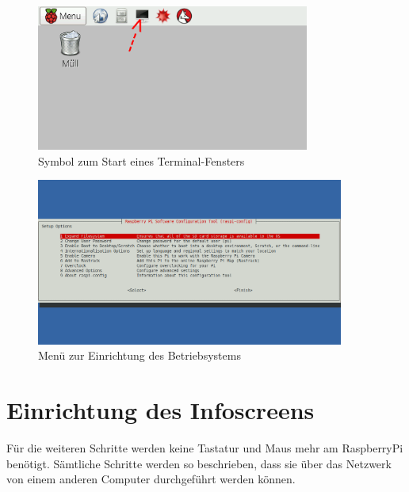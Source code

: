 \begin{figure}[h!]
	\centering
		\includegraphics[width=0.8\textwidth]{./fotos/terminal.png}
	\caption{Symbol zum Start eines Terminal-Fensters}
	\label{fig:rpiterminal}
\end{figure}

\begin{figure}[h!]
	\centering
		\includegraphics[width=0.9\textwidth]{./fotos/menu1.png}
	\caption{Menü zur Einrichtung des Betriebsystems}
	\label{fig:menu}
\end{figure}

\clearpage

\section{Einrichtung des Infoscreens}
\label{sec:stepssetup}
Für die weiteren Schritte werden keine Tastatur und Maus mehr am RaspberryPi benötigt. 
Sämtliche Schritte werden so beschrieben, dass sie über das Netzwerk von einem anderen Computer durchgeführt werden können.

